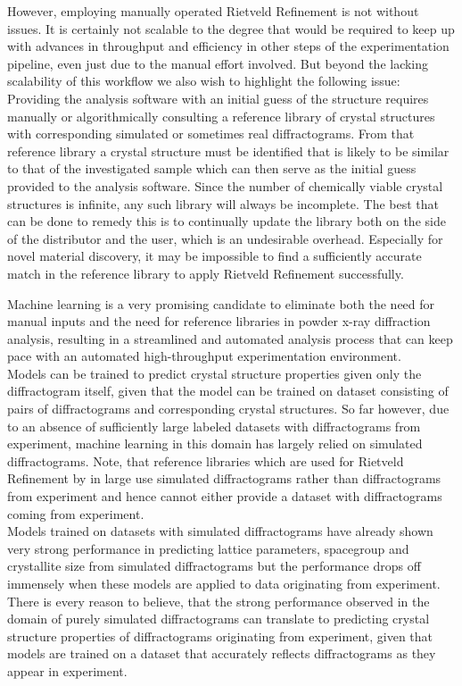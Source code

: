 However, employing manually operated Rietveld Refinement is not without issues.
It is certainly not scalable to the degree that would be required to keep up with advances
in throughput and efficiency in other steps of the experimentation pipeline, even just due to the manual effort involved.
But beyond the lacking scalability of this workflow we also wish to highlight the following issue:
Providing the analysis software with an initial guess of the structure requires manually or algorithmically
consulting a reference library of crystal structures with corresponding simulated or sometimes real diffractograms.
From that reference library a crystal structure must be identified that is likely to be similar
to that of the investigated sample which can then serve as the initial guess provided to the analysis software.
Since the number of chemically viable crystal structures is infinite, any such library will always be incomplete.
The best that can be done to remedy this is to continually update the library both on the side
of the distributor and the user, which is an undesirable overhead.
Especially for novel material discovery, it may be impossible to find a sufficiently accurate match in the reference
library to apply Rietveld Refinement successfully.

Machine learning is a very promising candidate to eliminate both the need for manual inputs and the need for reference
libraries in powder x-ray diffraction analysis, resulting in a streamlined and automated analysis process that can
keep pace with an automated high-throughput experimentation environment. \\

Models can be trained to predict crystal structure properties given only the diffractogram itself, given that
the model can be trained on dataset consisting of pairs of diffractograms and corresponding crystal structures.
So far however, due to an absence of sufficiently large labeled datasets with diffractograms from experiment,
machine learning in this domain has largely relied on simulated diffractograms.
Note, that reference libraries which are used for Rietveld Refinement by in large use simulated diffractograms
rather than diffractograms from experiment and hence cannot either provide a dataset with diffractograms coming
from experiment. \\

Models trained on datasets with simulated diffractograms have already shown very strong performance in predicting
lattice parameters, spacegroup and crystallite size from simulated diffractograms but the performance drops off immensely
when these models are applied to data originating from experiment.
There is every reason to believe, that the strong performance observed in the domain of purely simulated diffractograms
can translate to predicting crystal structure properties of diffractograms originating from experiment, given that
models are trained on a dataset that accurately reflects diffractograms as they appear in experiment. \\

